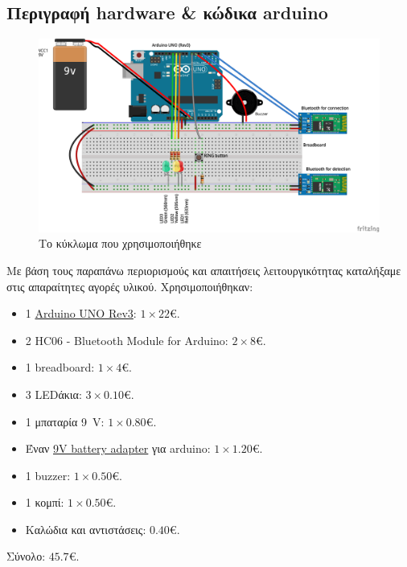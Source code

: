 \subsection{Περιγραφή hardware \& κώδικα arduino}
\renewcommand{\figurename}{Σχήμα}
\begin{figure}[htb]
    \centering
    \includegraphics[keepaspectratio, width=\linewidth]{hardware/sketch_bb}
    \caption{Το κύκλωμα που χρησιμοποιήθηκε}
    \label{fig:hardware}
\end{figure}
Με βάση τους παραπάνω περιορισμούς και απαιτήσεις λειτουργικότητας καταλήξαμε στις απαραίτητες αγορές υλικού.
Χρησιμοποιήθηκαν:
\begin{itemize}
\item 1 \href{https://www.arduino.cc/en/Main/ArduinoBoardUno}{Arduino UNO Rev3}:
$1 \times 22 \euro$.
\item 2 HC06 - Bluetooth Module for Arduino:
$2 \times 8 \euro$.
\item 1 breadboard:
$1 \times 4 \euro$.
\item 3 LEDάκια:
$3 \times 0.10 \euro$.
\item 1 μπαταρία \SI{9}{\volt}:
$1 \times 0.80 \euro$.
\item Έναν \href{http://playground.arduino.cc/Learning/9VBatteryAdapter}{9V battery adapter} για arduino:
$1 \times 1.20 \euro$.
\item 1 buzzer:
$1 \times 0.50 \euro$.
\item 1 κομπί:
$1 \times 0.50 \euro$.
\item Καλώδια και αντιστάσεις:
$0.40 \euro$.
\end{itemize}
Σύνολο: $45.7 \euro$.

